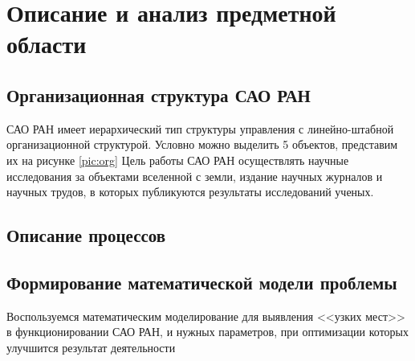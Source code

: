 \section{Описание и анализ предметной области}
\begin{comment}

пример рисунка
\addimghere{photo.jpg}{0.25}{1}{1}
\subsection{пример второго уровня заголовка}
@@ -14,10 +16,87 @@ \subsection{пример второго уровня заголовка}
\end{tabular}
\end{center}
\end{table}
\addimghere{commpa}{1}{Организация структуры на примере диаграммы компонентов}{commpa}
\addimghere{communication}{1}{Диаграмма коммуникации компонентов}{commu}
\addimghere{graph}{0.5}{Граф показывающий связь между объектами и передаваемый объем информации}{graph}
\section{Математическая модель}
бла бла 
\end{comment}

\subsection{Организационная структура САО РАН}
САО РАН имеет иерархический тип структуры управления с линейно-штабной организационной структурой. Условно можно выделить 5 объектов, представим их  на рисунке \ref{pic:org}
Цель работы САО РАН осуществлять научные исследования за объектами вселенной с земли, издание научных журналов и научных трудов, в которых публикуются результаты исследований ученых.
\subsection{Описание процессов}

\subsection{Формирование математической модели проблемы}
Воспользуемся математическим моделирование для выявления <<узких мест>> в функционировании САО РАН, и нужных параметров, при оптимизации которых улучшится результат деятельности


